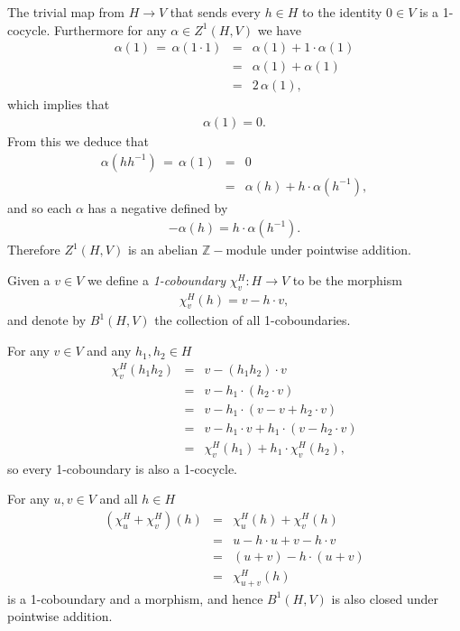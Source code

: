 The trivial map from $H \rightarrow V$ that sends every $h \in H$ to the identity $0 \in V$ is a 1-cocycle. Furthermore for any $\alpha \in Z^1(H, V)$ we have
\begin{eqnarray*}
	\alpha(1)\, =\, \alpha(1\cdot 1) &=& \alpha(1) + 1\cdot \alpha(1) \\
	&=& \alpha(1) + \alpha(1) \\
	&=& 2\,\alpha(1),
\end{eqnarray*}
which implies that
\begin{eqnarray*}
\alpha(1) = 0.
\end{eqnarray*}
From this we deduce that
\begin{eqnarray*}
	\alpha(hh^{-1})\, =\, \alpha(1) &=& 0 \\
	&=& \alpha(h) + h\cdot \alpha(h^{-1}),
\end{eqnarray*}
and so each $\alpha$ has a negative defined by
\begin{eqnarray*}
	-\alpha(h) = h\cdot\alpha(h^{-1}).
\end{eqnarray*}
Therefore $Z^1\left(H, V\right)$ is an abelian $\mathbb{Z}-$module under pointwise addition.

Given a $v \in V$ we define a \emph{1-coboundary} $\chi^H_v:H\rightarrow V$ to be the morphism
\begin{eqnarray*}
	\chi^H_v (h) = v - h\cdot v,
\end{eqnarray*}
and denote by $B^1\left(H, V\right)$ the collection of all 1-coboundaries. 

For any $v \in V$ and any $h_1, h_2 \in H$
\begin{eqnarray*}
	\chi^H_v(h_1h_2) &=& v - (h_1h_2)\cdot v \\
	&=& v - h_1 \cdot \left(h_2\cdot v \right)\\
	&=& v - h_1 \cdot \left(v -v + h_2\cdot v \right)\\
	&=& v - h_1\cdot v + h_1\cdot \left( v - h_2\cdot v\right)\\
	&=& \chi^H_v(h_1) + h_1\cdot \chi^H_v(h_2),
\end{eqnarray*}
so every 1-coboundary is also a 1-cocycle.

For any $u,v \in V$ and all $h \in H$
\begin{eqnarray*}
	(\chi^H_u + \chi^H_v)(h) &=& \chi^H_u(h) + \chi^H_v(h)\\
	&=& u - h\cdot u + v - h\cdot v \\
	&=& (u + v) - h\cdot (u + v) \\
	&=& \chi^H_{u + v} (h)
\end{eqnarray*}
is a 1-coboundary and a morphism, and hence $B^1\left(H, V\right)$ is also closed under pointwise addition.

